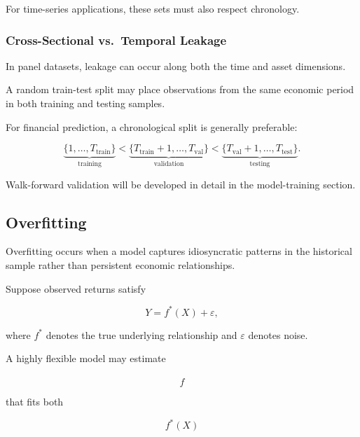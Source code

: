 \documentclass[11pt,a4paper]{article}
\begin{document}
For time-series applications, these sets must also respect chronology.


\subsubsection{Cross-Sectional vs.\ Temporal Leakage}

In panel datasets, leakage can occur along both the time and asset dimensions.

A random train-test split may place observations from the same economic period
in both training and testing samples.

For financial prediction, a chronological split is generally preferable:

\begin{equation}
\underbrace{
\{1,\ldots,T_{\mathrm{train}}\}
}_{\text{training}}
<
\underbrace{
\{T_{\mathrm{train}}+1,\ldots,T_{\mathrm{val}}\}
}_{\text{validation}}
<
\underbrace{
\{T_{\mathrm{val}}+1,\ldots,T_{\mathrm{test}}\}
}_{\text{testing}}.
\end{equation}

Walk-forward validation will be developed in detail in the model-training
section.


\subsection{Overfitting}
\label{subsec:overfitting}

Overfitting occurs when a model captures idiosyncratic patterns in the
historical sample rather than persistent economic relationships.

Suppose observed returns satisfy

\begin{equation}
Y
=
f^*(X)
+
\varepsilon,
\end{equation}

where $f^*$ denotes the true underlying relationship and $\varepsilon$ denotes
noise.

A highly flexible model may estimate

\begin{equation}
\widehat{f}
\end{equation}

that fits both

\begin{equation}
f^*(X)
\end{equation}
\end{document}
